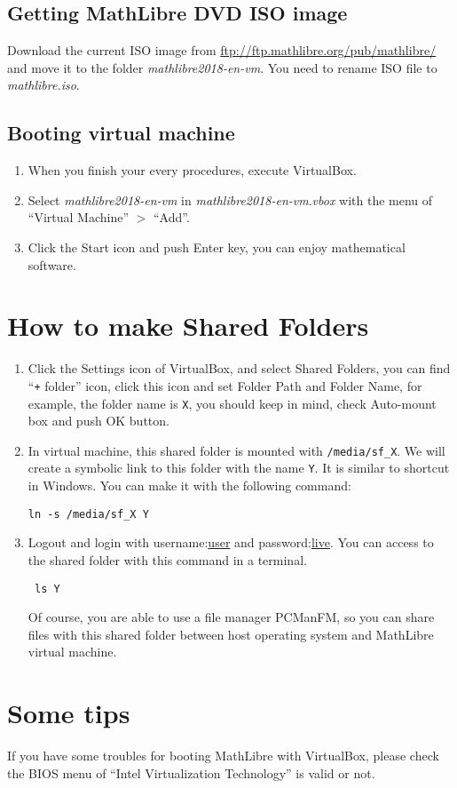 \documentclass[a4]{article}
\newcommand{\vm}{{\em mathlibre2018-en-vm}}
\begin{document}
\subsection{Getting MathLibre DVD ISO image}
Download the current ISO image from
\url{ftp://ftp.mathlibre.org/pub/mathlibre/}
and move it to the folder \vm{}. You need to rename ISO file to {\em mathlibre.iso}.

\subsection{Booting virtual machine}
\begin{enumerate}
 \item When you finish your every procedures, execute VirtualBox.
 \item Select \vm{} in \vm.{\em vbox} with the menu of ``Virtual Machine'' $>$ ``Add''.
 \item Click the Start icon and push Enter key, you can enjoy mathematical software.
\end{enumerate}

\section{How to make Shared Folders}
\begin{enumerate}
 \item Click the Settings icon of VirtualBox,
       and select Shared Folders, you can find
       ``\verb|+| folder'' icon, click this icon and set Folder Path and
       Folder Name, for example, the folder name is \verb|X|,
       you should keep in mind, check Auto-mount box and push OK button.
 \item  In virtual machine, this shared folder is mounted with
	\verb|/media/sf_X|. We will create a symbolic link to this folder with
	the name \verb|Y|. It is similar to shortcut in Windows. You can make
	it with the following command:
\begin{lstlisting}
ln -s /media/sf_X Y
\end{lstlisting}
\item Logout and login with username:\underline{user} and password:\underline{live}. You can access to the shared folder with this command in a terminal. 
\begin{lstlisting}
 ls Y
\end{lstlisting}
Of course, you are able to use a file manager PCManFM, so you can share
files with this shared folder between host operating system and
      MathLibre virtual machine.
\end{enumerate}

\section{Some tips}
If you have some troubles for booting MathLibre with VirtualBox,
please check the BIOS menu of ``Intel Virtualization Technology'' is
valid or not.
\end{document}
